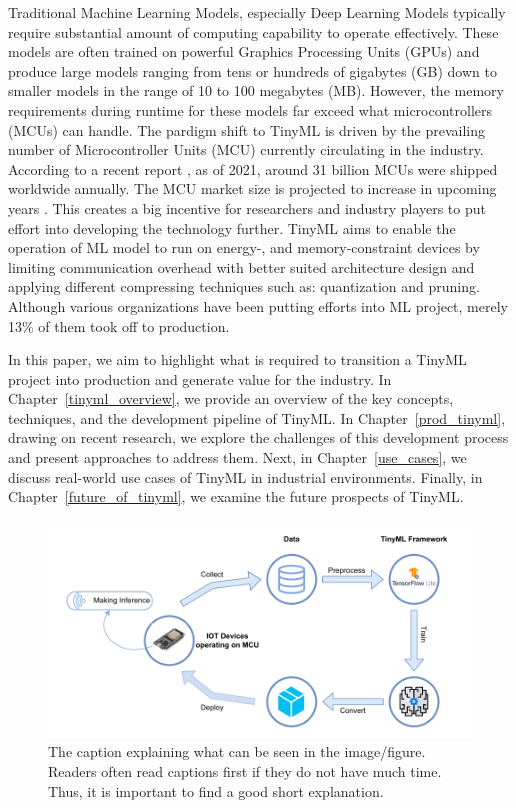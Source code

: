 \documentclass[twocolumn]{article}
\begin{document}
Traditional Machine Learning Models, especially Deep Learning Models typically require substantial amount of computing capability to operate effectively. These models are often trained on powerful Graphics Processing Units (GPUs) and produce large models ranging from tens or hundreds of gigabytes (GB) down to smaller models in the range of 10 to 100 megabytes (MB). However, the memory requirements during runtime for these models far exceed what microcontrollers (MCUs) can handle.
The pardigm shift to TinyML is driven by the prevailing number of Microcontroller Units (MCU) currently circulating in the industry. According to a recent report \cite{noauthor_microcontroller_nodate,grandviewresearch_research_2023}, as of 2021, around 31 billion MCUs were shipped worldwide annually. The MCU market size is projected to increase in upcoming years \cite{noauthor_microcontroller_nodate}. This creates a big incentive for researchers and industry players to put effort into developing the technology further.
TinyML aims to enable the operation of ML model to run on energy-, and memory-constraint devices by limiting communication overhead with better suited architecture design and applying different compressing techniques such as: quantization and pruning. Although various organizations have been putting efforts into ML project, merely 13\% of them took off to production. 

In this paper, we aim to highlight what is required to transition a TinyML project into production and generate value for the industry. In Chapter~\ref{tinyml_overview}, we provide an overview of the key concepts, techniques, and the development pipeline of TinyML. In Chapter~\ref{prod_tinyml}, drawing on recent research, we explore the challenges of this development process and present approaches to address them. Next, in Chapter~\ref{use_cases}, we discuss real-world use cases of TinyML in industrial environments. Finally, in Chapter~\ref{future_of_tinyml}, we examine the future prospects of TinyML.

\begin{figure}
	\centerline{
	\includegraphics[width=1\columnwidth]{resource/tinyml_deployment.pdf}
	}
	\caption{The caption explaining what can be seen in the image/figure.
	Readers often read captions first if they do not have much time. Thus,
	it is important to find a good short explanation.}
	\label{TUM}
\end{figure}
\end{document}
